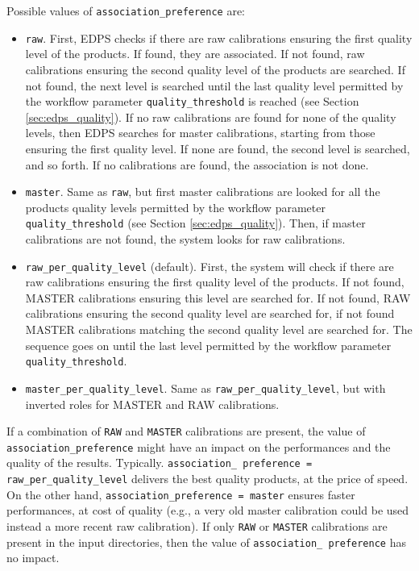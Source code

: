 Possible values of {\tt association\_preference} are:
\begin{itemize}
    \item {\tt raw}. First, EDPS checks if there are raw calibrations ensuring the first quality level of the products. If found, they are associated. If not found, raw calibrations ensuring the second quality level of the products are searched. If not found, the next level is searched until the last quality level permitted by the workflow parameter {\tt quality\_threshold} is reached (see Section \ref{sec:edps_quality}). If no raw calibrations are found for none of the quality levels, then EDPS searches for master calibrations, starting from those ensuring the first quality level.
    If none are found, the second level is searched, and so forth. If no calibrations are found, the association is not done.
    
    \item {\tt master}. Same as {\tt raw}, but first master calibrations are looked for all the products quality levels permitted by the workflow parameter {\tt quality\_threshold} (see Section \ref{sec:edps_quality}). Then, if master calibrations are not found, the system looks for raw calibrations.
    
    \item {\tt raw\_per\_quality\_level} (default).  First, the system will check if there are raw calibrations ensuring the first quality level of the products. If not found, MASTER calibrations ensuring this level are searched for. If not found, RAW calibrations ensuring the second quality level are searched for, if not found MASTER calibrations matching the second quality level are searched for. The sequence goes on until the last level permitted by the workflow parameter {\tt quality\_threshold}.
    
    \item {\tt master\_per\_quality\_level}.  Same as {\tt raw\_per\_quality\_level}, but with inverted roles for MASTER and RAW calibrations.
\end{itemize}

If a combination of {\tt RAW} and {\tt MASTER} calibrations are present, the  value of {\tt association\_preference} might have an impact on the performances and the quality of the results. Typically. {\tt association\_ preference = raw\_per\_quality\_level} delivers the best  quality products, at the price of speed. On the other hand, {\tt association\_preference = master} ensures faster performances, at cost of quality (e.g., a very old master calibration could be used instead a more recent raw calibration).
If only {\tt RAW} or {\tt MASTER} calibrations are present in the input directories, then the value of {\tt association\_ preference} has no impact.


